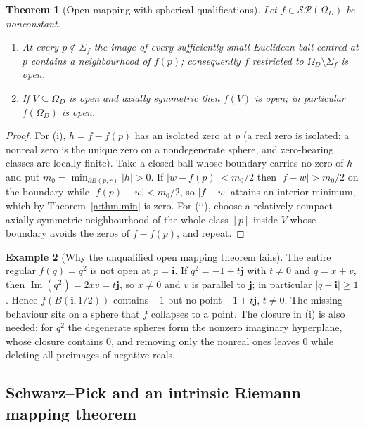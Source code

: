 \documentclass[11pt,a4paper]{article}
\numberwithin{equation}{section}
\newtheorem{theorem}{Theorem}[section]
\theoremstyle{definition}
\newtheorem{example}[theorem]{Example}
\theoremstyle{remark}
\theoremstyle{plain}
\DeclareMathOperator{\Ima}{Im}
\newcommand{\SR}{\mathcal{SR}}
\newcommand{\Om}{\Omega}
\newcommand{\abs}[1]{\lvert #1\rvert}
\begin{document}
\begin{theorem}[Open mapping with spherical qualifications]
\label{a:thm:open}
Let $f\in\SR(\Om_D)$ be nonconstant.
\begin{enumerate}[label=\textup{(\roman*)}]
\item At every $p\notin\Sigma_f$ the image of every sufficiently small
Euclidean ball centred at $p$ contains a neighbourhood of $f(p)$;
consequently $f$ restricted to $\Om_D\setminus\overline{\Sigma_f}$ is open.
\item If $V\subseteq\Om_D$ is open and axially symmetric then $f(V)$ is open;
in particular $f(\Om_D)$ is open.
\end{enumerate}
\end{theorem}

\begin{proof}
For (i), $h=f-f(p)$ has an isolated zero at $p$ (a real zero is isolated; a
nonreal zero is the unique zero on a nondegenerate sphere, and zero-bearing
classes are locally finite). Take a closed ball whose boundary carries no
zero of $h$ and put $m_0=\min_{\partial B(p,r)}\abs h>0$. If
$\abs{w-f(p)}<m_0/2$ then $\abs{f-w}>m_0/2$ on the boundary while
$\abs{f(p)-w}<m_0/2$, so $\abs{f-w}$ attains an interior minimum, which by
Theorem~\ref{a:thm:min} is zero. For (ii), choose a relatively compact
axially symmetric neighbourhood of the whole class $[p]$ inside $V$ whose
boundary avoids the zeros of $f-f(p)$, and repeat.
\end{proof}

\begin{example}[Why the unqualified open mapping theorem fails]
\label{a:ex:q2}
The entire regular $f(q)=q^2$ is not open at $p=\mathbf i$. If $q^2=-1+t\mathbf j$
with $t\ne0$ and $q=x+v$, then $\Ima(q^2)=2xv=t\mathbf j$, so $x\ne0$ and $v$ is
parallel to $\mathbf j$; in particular $\abs{q-\mathbf i}\ge1$. Hence
$f(B(\mathbf i,1/2))$ contains $-1$ but no point $-1+t\mathbf j$, $t\ne0$. The
missing behaviour sits on a sphere that $f$ collapses to a point. The closure
in (i) is also needed: for $q^2$ the degenerate spheres form the nonzero
imaginary hyperplane, whose closure contains $0$, and removing only the
nonreal ones leaves $0$ while deleting all preimages of negative reals.
\end{example}

\subsection{Schwarz--Pick and an intrinsic Riemann mapping theorem}
\label{a:sec:geometry}
\end{document}
